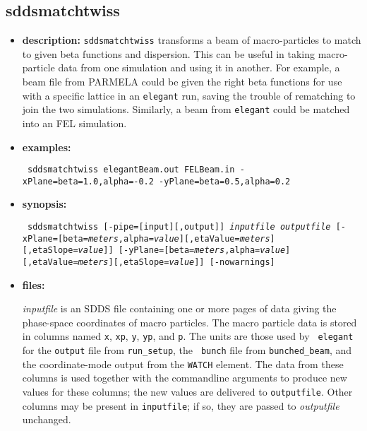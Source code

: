 \documentclass[11pt]{article}
\begin{document}
\subsection{sddsmatchtwiss}
\label{sddsmatchtwiss}

\begin{itemize}
\item {\bf description:} 
{\tt sddsmatchtwiss} transforms a beam of macro-particles to match to given beta
functions and dispersion.   This can be useful in taking macro-particle data from
one simulation and using it in another.  For example, a beam file from PARMELA
could be given the right beta functions for use with a specific lattice in an
{\tt elegant} run, saving the trouble of rematching to join the two simulations.
Similarly, a beam from {\tt elegant} could be matched into an FEL simulation.

\item {\bf examples:}
\begin{flushleft}{\tt
sddsmatchtwiss elegantBeam.out FELBeam.in -xPlane=beta=1.0,alpha=-0.2 -yPlane=beta=0.5,alpha=0.2
}\end{flushleft}

\item {\bf synopsis:}
\begin{flushleft}{\tt
sddsmatchtwiss [-pipe=[input][,output]] {\em inputfile} {\em outputfile}
[-xPlane=[beta={\em meters},alpha={\em value}][,etaValue={\em meters}][,etaSlope={\em value}]]
[-yPlane=[beta={\em meters},alpha={\em value}][,etaValue={\em meters}][,etaSlope={\em value}]]
[-nowarnings]
}\end{flushleft}

\item {\bf files:}

{\em inputfile} is an SDDS file containing one or more pages of data
giving the phase-space coordinates of macro particles.  The macro
particle data is stored in columns named \verb|x|, \verb|xp|,
\verb|y|, \verb|yp|, and \verb|p|.  The units are those used by {\tt
elegant} for the {\tt output} file from {\tt run\_setup}, the {\tt
bunch} file from {\tt bunched\_beam}, and the coordinate-mode output
from the {\tt WATCH} element. The data from these columns is used
together with the commandline arguments to produce new values for
these columns; the new values are delivered to {\tt outputfile}.
Other columns may be present in {\tt inputfile}; if so, they are
passed to {\em outputfile} unchanged.


\end{itemize}
\end{document}
